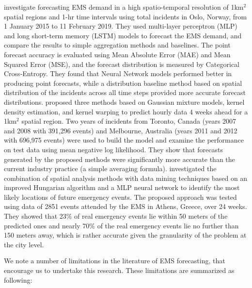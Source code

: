 \documentclass[
  authoryear,
  preprint,
  3p]{elsarticle}
\begin{document}
\citet{9659837} investigate forecasting EMS demand in a high
spatio-temporal resolution of 1km\(^2\) spatial regions and 1-hr time
intervals using total incidents in Oslo, Norway, from 1 January 2015 to
11 February 2019. They used multi-layer perceptron (MLP) and long
short-term memory (LSTM) models to forecast the EMS demand, and compare
the results to simple aggregation methods and baselines. The point
forecast accuracy is evaluated using Mean Absolute Error (MAE) and Mean
Squared Error (MSE), and the forecast distribution is measured by
Categorical Cross-Entropy. They found that Neural Network models
performed better in producing point forecasts, while a distribution
baseline method based on spatial distribution of the incidents across
all time steps provided more accurate forecast distributions.
\citet{zhou2016predictinglit} proposed three methods based on Gaussian
mixture models, kernel density estimation, and kernel warping to predict
hourly data 4 weeks ahead for a 1km\(^2\) spatial region. Two years of
incidents from Toronto, Canada (years 2007 and 2008 with 391,296 events)
and Melbourne, Australia (years 2011 and 2012 with 696,975 events) were
used to build the model and examine the performance on test data using
mean negative log likelihood. They show that forecasts generated by the
proposed methods were significantly more accurate than the current
industry practice (a simple averaging formula).
\citet{grekousis2019will} investigated the combination of spatial
analysis methods with data mining techniques based on an improved
Hungarian algorithm and a MLP neural network to identify the most likely
locations of future emergency events. The proposed approach was tested
using data of 2851 events attended by the EMS in Athens, Greece, over 24
weeks. They showed that 23\% of real emergency events lie within 50
meters of the predicted ones and nearly 70\% of the real emergency
events lie no further than 150 meters away, which is rather accurate
given the granularity of the problem at the city level.

We note a number of limitations in the literature of EMS forecasting,
that encourage us to undertake this research. These limitations are
summarized as following:
\end{document}
